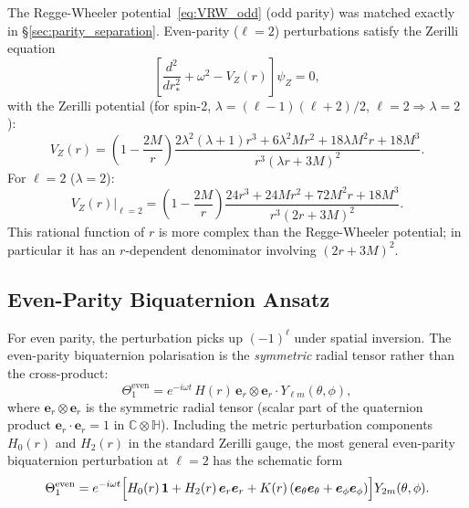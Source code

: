 \documentclass[12pt]{article}
\theoremstyle{definition}
\theoremstyle{remark}
\begin{document}
The Regge-Wheeler potential~\eqref{eq:VRW_odd} (odd parity) was matched
exactly in §\ref{sec:parity_separation}.  Even-parity ($\ell=2$)
perturbations satisfy the Zerilli equation
\begin{equation}
  \left[\frac{d^2}{dr_*^2} + \omega^2 - V_Z(r)\right]\psi_Z = 0,
  \label{eq:zerilli_eq}
\end{equation}
with the Zerilli potential (for spin-2, $\lambda = (\ell-1)(\ell+2)/2$,
$\ell = 2 \Rightarrow \lambda = 2$):
\begin{equation}
  V_Z(r) = \left(1-\frac{2M}{r}\right)
    \frac{2\lambda^2(\lambda+1)r^3 + 6\lambda^2 Mr^2
          + 18\lambda M^2 r + 18M^3}
         {r^3(\lambda r + 3M)^2}.
  \label{eq:VZ_general}
\end{equation}
For $\ell=2$ ($\lambda=2$):
\begin{equation}
  V_Z(r)\big|_{\ell=2}
  = \left(1-\frac{2M}{r}\right)
    \frac{24r^3 + 24Mr^2 + 72M^2 r + 18M^3}
         {r^3(2r+3M)^2}.
  \label{eq:VZ_l2}
\end{equation}
This rational function of $r$ is more complex than the Regge-Wheeler
potential; in particular it has an $r$-dependent denominator involving
$(2r+3M)^2$.

\subsection{Even-Parity Biquaternion Ansatz}

For even parity, the perturbation picks up $(-1)^\ell$ under spatial
inversion. The even-parity biquaternion polarisation is the \emph{symmetric}
radial tensor rather than the cross-product:
\begin{equation}
  \Theta_1^{\text{even}} = e^{-i\omega t}\, H(r)\,
    \boldsymbol{e}_r \otimes \boldsymbol{e}_r \cdot Y_{\ell m}(\theta,\phi),
  \label{eq:theta1_even}
\end{equation}
where $\boldsymbol{e}_r \otimes \boldsymbol{e}_r$ is the symmetric radial
tensor (scalar part of the quaternion product $\boldsymbol{e}_r
\cdot \boldsymbol{e}_r = 1$ in $\mathbb{C}\otimes\mathbb{H}$).
Including the metric perturbation components $H_0(r)$ and $H_2(r)$ in the
standard Zerilli gauge, the most general even-parity biquaternion perturbation
at $\ell=2$ has the schematic form
\begin{equation}
  \Theta_1^{\text{even}} = e^{-i\omega t}
  \Bigl[H_0(r)\,\mathbf{1} + H_2(r)\,\boldsymbol{e}_r\boldsymbol{e}_r
        + K(r)\,(\boldsymbol{e}_\theta\boldsymbol{e}_\theta
                + \boldsymbol{e}_\phi\boldsymbol{e}_\phi)
  \Bigr] Y_{2m}(\theta,\phi).
  \label{eq:theta1_even_full}
\end{equation}
\end{document}
